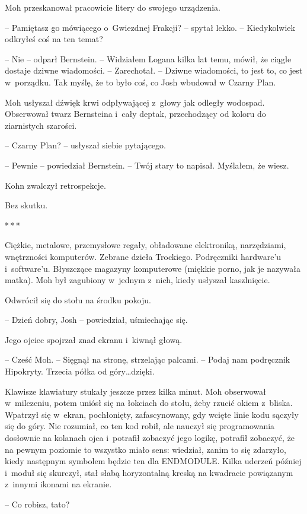 \documentclass[oneside,polish,11pt,sfheadings]{mwbk}
\newcommand{\threeast}{\bigskip\par\centerline{*\,*\,*}\medskip\par}%
\begin{document}
Moh przeskanował pracowicie litery do swojego urządzenia.

-- Pamiętasz go mówiącego o~Gwiezdnej Frakcji? -- spytał lekko. -- Kiedykolwiek odkryłeś coś na ten temat?

-- Nie -- odparł Bernstein. -- Widziałem Logana kilka lat temu, mówił, że
ciągle dostaje dziwne wiadomości. -- Zarechotał. -- Dziwne wiadomości, to
jest to, co jest w~porządku. Tak myślę, że to było coś, co Josh wbudował
w Czarny Plan.

Moh usłyszał dźwięk krwi odpływającej z~głowy jak odległy wodospad.
Obserwował twarz Bernsteina i~cały deptak, przechodzący od koloru do
ziarnistych szarości.

-- Czarny Plan? -- usłyszał siebie pytającego.

-- Pewnie -- powiedział Bernstein. -- Twój stary to napisał. Myślałem, że
wiesz.

Kohn zwalczył retrospekcje.

Bez skutku.

  \threeast 

Ciężkie, metalowe, przemysłowe regały, obładowane elektroniką,
narzędziami, wnętrzności komputerów. Zebrane dzieła Trockiego.
Podręczniki hardware'u i~software'u. Błyszczące magazyny komputerowe
(miękkie porno, jak je nazywała matka). Moh był zagubiony w~jednym z~nich, kiedy usłyszał kaszlnięcie.

Odwrócił się do stołu na środku pokoju.

-- Dzień dobry, Josh -- powiedział, uśmiechając się.

Jego ojciec spojrzał znad ekranu i~kiwnął głową. 

-- Cześć Moh. -- Sięgnął
na stronę, strzelając palcami. -- Podaj nam podręcznik Hipokryty. Trzecia
półka od góry\ldots dzięki.

Klawisze klawiatury stukały jeszcze przez kilka minut. Moh obserwował w~milczeniu, potem uniósł się na łokciach do stołu, żeby rzucić okiem z~bliska. Wpatrzył się w~ekran, pochłonięty, zafascynowany, gdy wcięte
linie kodu sączyły się do góry. Nie rozumiał, co ten kod robił, ale
nauczył się programowania dosłownie na kolanach ojca i~potrafił zobaczyć
jego logikę, potrafił zobaczyć, że na pewnym poziomie to wszystko miało
sens: wiedział, zanim to się zdarzyło, kiedy następnym symbolem będzie
ten dla ENDMODULE. Kilka uderzeń później i~moduł się skurczył, stał
słabą horyzontalną kreską na kwadracie powiązanym z~innymi ikonami na
ekranie.

-- Co robisz, tato?
\end{document}
